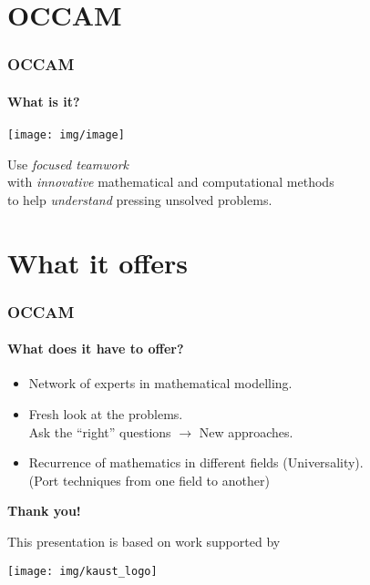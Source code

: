 \documentclass{beamer}
\begin{document}
\section{OCCAM}

\begin{frame}\frametitle{OCCAM}
\framesubtitle{What is it?}

\centerline{\texttt{[image: img/image]}}

\bigskip

\pause
Use \emph{focused teamwork}\\
\pause
with \emph{innovative} mathematical and computational methods\\
\pause
to help \emph{understand} pressing unsolved problems.

\bigskip

\end{frame}


\section{What it offers}

\begin{frame}\frametitle{OCCAM}
\framesubtitle{What does it have to offer?}

\begin{itemize}

\item Network of experts in mathematical modelling.
\pause

\item Fresh look at the problems.\\
Ask the ``right'' questions $\to$ New approaches.
\pause

\item Recurrence of mathematics in different fields (Universality).\\
{\tiny (Port techniques from one field to another)}

\end{itemize}

\end{frame}


\begin{frame}
\center

\vfill

{
\Huge%
\textbf{Thank you!}
}

\vfill

{\tiny
This presentation is based on work supported by

\smallskip

\texttt{[image: img/kaust\_logo]}
}

\end{frame}
\end{document}
